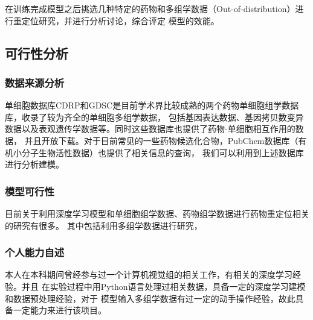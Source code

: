 在训练完成模型之后挑选几种特定的药物和多组学数据（Out-of-distribution）进行重定位研究，并进行分析讨论，综合评定
模型的效能。


\subsection{可行性分析}

\subsubsection{数据来源分析}
单细胞数据库CDRP和GDSC是目前学术界比较成熟的两个药物单细胞组学数据库，收录了较为齐全的单细胞多组学数据，
包括基因表达数据、基因拷贝数变异数据以及表观遗传学数据等。同时这些数据库也提供了药物-单细胞相互作用的数据，
并且开放下载。对于目前常见的一些药物候选化合物，PubChem数据库（有机小分子生物活性数据）也提供了相关信息的查询，
我们可以利用到上述数据库进行分析建模。


\subsubsection{模型可行性}
目前关于利用深度学习模型和单细胞组学数据、药物组学数据进行药物重定位相关的研究有很多。
其中包括利用多组学数据进行研究，


\subsubsection{个人能力自述}
本人在本科期间曾经参与过一个计算机视觉组的相关工作，有相关的深度学习经验。并且
在实验过程中用Python语言处理过相关数据，具备一定的深度学习建模和数据预处理经验，对于
模型输入多组学数据有过一定的动手操作经验，故此具备一定能力来进行该项目。
